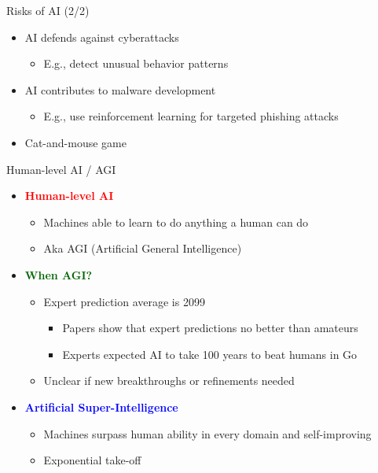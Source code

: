 \documentclass[
  10pt,
  ignorenonframetext,
]{beamer}
\providecommand{\tightlist}{%
  \setlength{\itemsep}{0pt}\setlength{\parskip}{0pt}}
\begin{document}
\begin{frame}{Risks of AI (2/2)}
\begin{itemize}
  \begin{itemize}
  \tightlist
  \item
    AI defends against cyberattacks

    \begin{itemize}
    \tightlist
    \item
      E.g., detect unusual behavior patterns
    \end{itemize}
  \item
    AI contributes to malware development

    \begin{itemize}
    \tightlist
    \item
      E.g., use reinforcement learning for targeted phishing attacks
    \end{itemize}
  \item
    Cat-and-mouse game
  \end{itemize}
\end{itemize}
\end{frame}

\begin{frame}{Human-level AI / AGI}
\label{human-level-ai-agi}
\begin{itemize}
\tightlist
\item
  \textbf{\textcolor{red}{Human-level AI}}

  \begin{itemize}
  \tightlist
  \item
    Machines able to learn to do anything a human can do
  \item
    Aka AGI (Artificial General Intelligence)
  \end{itemize}
\item
  \textbf{\textcolor{darkgreen}{When AGI?}}

  \begin{itemize}
  \tightlist
  \item
    Expert prediction average is 2099

    \begin{itemize}
    \tightlist
    \item
      Papers show that expert predictions no better than amateurs
    \item
      Experts expected AI to take 100 years to beat humans in Go
    \end{itemize}
  \item
    Unclear if new breakthroughs or refinements needed
  \end{itemize}
\item
  \textbf{\textcolor{blue}{Artificial Super-Intelligence}}

  \begin{itemize}
  \tightlist
  \item
    Machines surpass human ability in every domain and self-improving
  \item
    Exponential take-off
  \end{itemize}
\end{itemize}
\end{frame}
\end{document}
